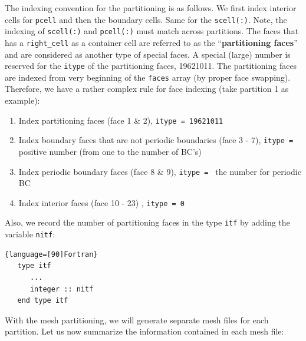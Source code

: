 \documentclass[11pt, letterpaper]{report}
\begin{document}
The indexing convention for the partitioning is as follows. We first index interior cells for
\verb+pcell+ and then the boundary cells. Same for the \verb+scell(:)+. Note, the indexing of
\verb+scell(:)+ and \verb+pcell(:)+ must match across partitions. The faces that has a
\verb+right_cell+ as a container cell are referred to as the ``{\bf partitioning faces}'' and are
considered as another type of special faces. A special (large) number is reserved for the
\verb+itype+ of the partitioning faces, 19621011. The partitioning faces are indexed from very
beginning of the \verb+faces+ array (by proper face swapping). Therefore, we have a rather complex
rule for face indexing (take partition 1 as example):

\begin{enumerate}
   \item Index partitioning faces (face 1 \& 2), \verb+itype = 19621011+
   \item Index boundary faces that are not periodic boundaries (face 3 - 7), \verb+itype = + positive
      number (from one to the number of BC's)
   \item Index periodic boundary faces (face 8 \& 9), \verb+itype = + the number for periodic BC
   \item Index interior faces (face 10 - 23) , \verb+itype = 0+
\end{enumerate}

Also, we record the number of partitioning faces in the type \verb+itf+ by adding the variable
\verb+nitf+:

\begin{lstlisting}{language=[90]Fortran}
   type itf
      ...
      integer :: nitf
   end type itf
\end{lstlisting}
\paraspace

With the mesh partitioning, we will generate separate mesh files for each partition. Let us now
summarize the information contained in each mesh file:
\end{document}
